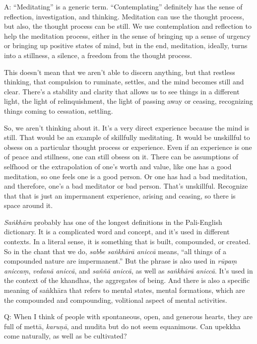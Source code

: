 \vspace{\the\qaskip}
A: “Meditating” is a generic term. “Contemplating” definitely has the
sense of reflection, investigation, and thinking. Meditation can use the
thought process, but also, the thought process can be still. We use
contemplation and reflection to help the meditation process, either in
the sense of bringing up a sense of urgency or bringing up positive
states of mind, but in the end, meditation, ideally, turns into a
stillness, a silence, a freedom from the thought process.

This doesn’t mean that we aren’t able to discern anything, but that
restless thinking, that compulsion to ruminate, settles, and the mind
becomes still and clear. There’s a stability and clarity that allows us
to see things in a different light, the light of relinquishment, the
light of passing away or ceasing, recognizing things coming to
cessation, settling.

So, we aren’t thinking about it. It’s a very direct experience because
the mind is still. That would be an example of skillfully meditating. It
would be unskillful to obsess on a particular thought process or
experience. Even if an experience is one of peace and stillness, one can
still obsess on it. There can be assumptions of selfhood or the
extrapolation of one’s worth and value, like one has a good meditation,
so one feels one is a good person. Or one has had a bad meditation, and
therefore, one’s a bad meditator or bad person. That’s unskillful.
Recognize that that is just an impermanent experience, arising and
ceasing, so there is space around it.

\emph{Saṅkhāra} probably has one of the longest definitions in the
Pali-English dictionary. It is a complicated word and concept, and it’s
used in different contexts. In a literal sense, it is something that is
built, compounded, or created. So in the chant that we do, \emph{sabbe
saṅkhārā aniccā} means, “all things of a compounded nature are
impermanent.” But the phrase is also used in \emph{rūpaṃ aniccaṃ},
\emph{vedanā aniccā}, and \emph{saññā aniccā}, as well as \emph{saṅkhārā
aniccā}. It’s used in the context of the khandhas, the aggregates of
being. And there is also a specific meaning of saṅkhāra that refers to
mental states, mental formations, which are the compounded and
compounding, volitional aspect of mental activities.

\vspace{\the\qaskip}
Q: When I think of people with spontaneous, open, and generous hearts,
they are full of mettā, \emph{karuṇā}, and mudita but do not seem
equanimous. Can upekkha come naturally, as well as be cultivated?


